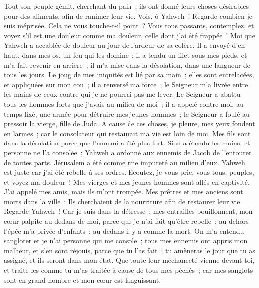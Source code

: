 \begin{multicols}{2}
 Tout son peuple gémit, cherchant du pain~; ils ont donné leurs choses désirables pour des aliments, afin de ranimer leur vie. Vois, ô Yahweh~! Regarde combien je suis méprisée.
 Cela ne vous touche-t-il point~? Vous tous passants, contemplez, et voyez s'il est une douleur comme ma douleur, celle dont j'ai été frappée~! Moi que Yahweh a accablée de douleur au jour de l'ardeur de sa colère.
 Il a envoyé d'en haut, dans mes os, un feu qui les domine~; il a tendu un filet sous mes pieds, et m'a fait revenir en arrière~; il m'a mise dans la désolation, dans une langueur de tous les jours.
 Le joug de mes iniquités est lié par sa main~; elles sont entrelacées, et appliquées sur mon cou~; il a renversé ma force~; le Seigneur m'a livrée entre les mains de ceux contre qui je ne pourrai pas me lever.
 Le Seigneur a abattu tous les hommes forts que j'avais au milieu de moi~; il a appelé contre moi, au temps fixé, une armée pour détruire mes jeunes hommes~; le Seigneur a foulé au pressoir la vierge, fille de Juda.
 A cause de ces choses, je pleure, mes yeux fondent en larmes~; car le consolateur qui restaurait ma vie est loin de moi. Mes fils sont dans la désolation parce que l'ennemi a été plus fort.
 Sion a étendu les mains, et personne ne l'a consolée~; Yahweh a ordonné aux ennemis de Jacob de l'entourer de toutes parts. Jérusalem a été comme une impureté au milieu d'eux.
 Yahweh est juste car j'ai été rebelle à ses ordres. Ecoutez, je vous prie, vous tous, peuples, et voyez ma douleur~! Mes vierges et mes jeunes hommes sont allés en captivité.
 J'ai appelé mes amis, mais ils m'ont trompée. Mes prêtres et mes anciens sont morts dans la ville~: Ils cherchaient de la nourriture afin de restaurer leur vie.
 Regarde Yahweh~! Car je suis dans la détresse~; mes entrailles bouillonnent, mon cœur palpite au-dedans de moi, parce que je n'ai fait qu'être rebelle~; au-dehors l'épée m'a privée d'enfants~; au-dedans il y a comme la mort.
 On m'a entendu sangloter et je n'ai personne qui me console~; tous mes ennemis ont appris mon malheur, et s'en sont réjouis, parce que tu l'as fait~; tu amèneras le jour que tu as assigné, et ils seront dans mon état.
Que toute leur méchanceté vienne devant toi, et traite-les comme tu m'as traitée à cause de tous mes péchés~; car mes sanglots sont en grand nombre et mon cœur est languissant.

\end{multicols}
